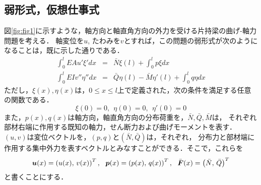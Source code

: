 \documentclass[10pt,a4j]{jarticle}
\begin{document}
\subsection{弱形式，仮想仕事式}
図\ref{fig:fig1}に示すような，軸方向と軸直角方向の外力を受ける片持梁の曲げ-軸力問題を考える．
軸変位を$u$, たわみを$v$とすれば，この問題の弱形式が次のようになることは，既に示した通りである．
\begin{eqnarray}
	\int_0^l EAu'\xi'dx &= & 
	\bar N \xi(l)+\int_0^l p\xi dx 
	\label{eqn:WF_N}
	\\
	\int_0^l EIv''\eta''dx &= & 
	\bar Q \eta(l)-\bar M\eta'(l) +\int_0^l q\eta dx 
	\label{eqn:WF_M}
\end{eqnarray}
ただし，$\xi(x),\eta(x)$は，$0\leq x \leq l$上で定義された，次の条件を満足する任意の関数である．
\begin{equation}
	\xi(0)=0, \ \ \eta(0)=0, \ \ \eta'(0)=0
	\label{eqn:}
\end{equation}
また，$p(x),q(x)$は軸方向，軸直角方向の分布荷重を，$\bar{N},\bar{Q},\bar{M}$は，
それぞれ部材右端に作用する既知の軸力，せん断力および曲げモーメントを表す．
$(u,v)$は変位ベクトルを，$(p,q)$と$(\bar{N},\bar{Q})$は，それぞれ，
分布力と部材端に作用する集中外力を表すベクトルとみなすことができる．そこで，これらを
\begin{equation}
	\fat{u}(x)=\left(u(x),\, v(x) \right)^T
	, \ \ 
	\fat{p}(x)=\left(p(x),\, q(x) \right)^T
	, \ \ 
	\bar{\fat{F}}(x)=\left(\bar{N},\, \bar{Q} \right)^T
	\label{eqn:def_vecs}
\end{equation}
と書くことにする．
\end{document}
